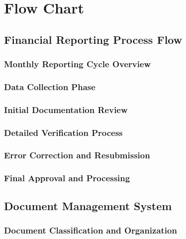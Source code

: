 
\chapter{Flow Chart}

\section{Financial Reporting Process Flow}

\subsection{Monthly Reporting Cycle Overview}

\subsection{Data Collection Phase}

\subsection{Initial Documentation Review}

\subsection{Detailed Verification Process}

\subsection{Error Correction and Resubmission}

\subsection{Final Approval and Processing}

\section{Document Management System}

\subsection{Document Classification and Organization}

